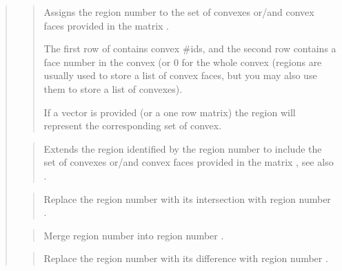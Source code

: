 \documentclass[a4paper,11pt,english]{sphinxmanual}
\begin{document}
\begin{quote}
\begin{quote}
Assigns the region number  to the set of convexes or/and convex
faces provided in the matrix .

The first row of  contains convex \#ids, and the second row
contains a face number in the convex (or 0
for the whole convex (regions are usually used to store a list of
convex faces, but you may also use them to store a list of convexes).

If a vector is provided (or a one row matrix) the region will represent
the corresponding set of convex.
\end{quote}

\begin{quote}

Extends the region identified by the region number  to include
the set of convexes or/and convex faces provided in the matrix
, see also .
\end{quote}

\begin{quote}

Replace the region number  with its intersection with region number .
\end{quote}

\begin{quote}

Merge region number  into region number .
\end{quote}

\begin{quote}

Replace the region number  with its difference with region
number .
\end{quote}

\begin{quote}


\end{quote}
\end{quote}
\end{document}
